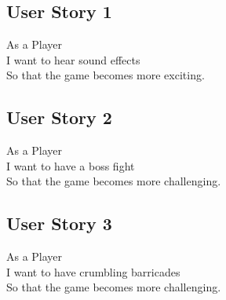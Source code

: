 \documentclass[10pt]{article}
\begin{document}
\subsection*{User Story 1}
As a Player\\ 
\indent I want to hear sound effects\\
So that the game becomes more exciting.

\subsection*{User Story 2}
As a Player\\ 
\indent I want to have a boss fight\\
So that the game becomes more challenging.

\subsection*{User Story 3}
As a Player\\ 
\indent I want to have crumbling barricades\\
So that the game becomes more challenging.
\end{document}
